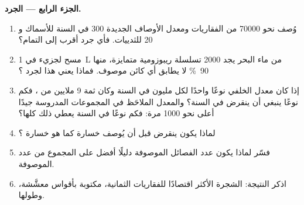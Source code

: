 \begin{problem}
\medskip
\noindent\textbf{الجزء الرابع --- الجرد.}
\begin{enumerate}[resume]
  \item وُصف نحو \num{70000}  من الفقاريات ومعدل
        الأوصاف الجديدة \num{300} في السنة للأسماك و
        \num{20} للثدييات. فأي جرد أقرب إلى التمام؟
  \item مسح لجزيء  في \qty{1}{L} من ماء البحر يجد
        \num{2000} تسلسلة ريبوزومية متمايزة، منها
        \qty{90}{\%} لا يطابق أي كائن موصوف. فماذا يعني هذا
        لجرد ؟
  \item إذا كان معدل  الخلفي نوعًا واحدًا لكل مليون
        في السنة وكان ثمة \num{9} ملايين  من ،
        فكم نوعًا ينبغي أن ينقرض في السنة؟ والمعدل الملاحَظ في
        المجموعات المدروسة جيدًا أعلى نحو \num{1000} مرة: فكم
        نوعًا في السنة يعطي ذلك  كلها؟
  \item لماذا يكون  ينقرض قبل أن يُوصف خسارة
         كما هو خسارة ؟
  \item فسّر لماذا يكون عدد الفصائل الموصوفة دليلًا أفضل
        على المجموع من عدد  الموصوفة.
  \item اذكر النتيجة: الشجرة الأكثر اقتصادًا للفقاريات
        الثمانية، مكتوبة بأقواس معشَّشة، وطولها.
\end{enumerate}
\end{problem}
